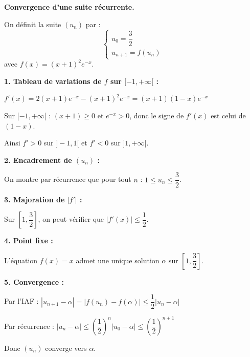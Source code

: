 \documentclass[../PolyS2.tex]{subfiles}
\begin{document}
\begin{Ex}
\textbf{Convergence d'une suite récurrente.}

On définit la suite $(u_n)$ par :
$$\begin{cases}
    u_0 = \dfrac{3}{2} \\[1em]
    u_{n+1} = f(u_n)
\end{cases}$$
avec $f(x) = (x+1)^2 e^{-x}$.

\vspace{2em}

\vspace{1em}

\textbf{1. Tableau de variations de $f$ sur $[-1, +\infty[$ :}

$f'(x) = 2(x+1)e^{-x} - (x+1)^2 e^{-x} = (x+1)(1-x)e^{-x}$

Sur $[-1, +\infty[$ : $(x+1) \geq 0$ et $e^{-x} > 0$, donc le signe de $f'(x)$ est celui de $(1-x)$.

Ainsi $f' > 0$ sur $]-1, 1[$ et $f' < 0$ sur $]1, +\infty[$.

\vspace{1em}

\textbf{2. Encadrement de $(u_n)$ :}

On montre par récurrence que pour tout $n$ : $1 \leq u_n \leq \dfrac{3}{2}$.

\vspace{1em}

\textbf{3. Majoration de $|f'|$ :}

Sur $\left[1, \dfrac{3}{2}\right]$, on peut vérifier que $|f'(x)| \leq \dfrac{1}{2}$.

\vspace{1em}

\textbf{4. Point fixe :}

L'équation $f(x) = x$ admet une unique solution $\alpha$ sur $\left[1, \dfrac{3}{2}\right]$.

\vspace{1em}

\textbf{5. Convergence :}

Par l'IAF : $|u_{n+1} - \alpha| = |f(u_n) - f(\alpha)| \leq \dfrac{1}{2}|u_n - \alpha|$

Par récurrence : $|u_n - \alpha| \leq \left(\dfrac{1}{2}\right)^n |u_0 - \alpha| \leq \left(\dfrac{1}{2}\right)^{n+1}$

Donc $(u_n)$ converge vers $\alpha$.
\end{Ex}

\end{document}
